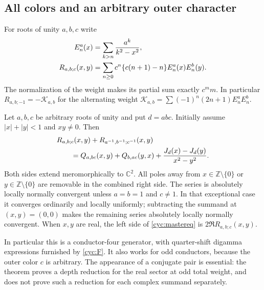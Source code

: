 \subsection{All colors and an arbitrary outer character}

For roots of unity $a,b,c$ write
\begin{align}
 E_n^a(x)&=\sum_{k>n}\frac{a^k}{k^2-x^2},\notag\\
 R_{a,b;c}(x,y)&=\sum_{n\ge0}c^n\{c(n+1)-n\}
                                      E_n^a(x)E_n^b(y).
 \label{cyc:R}
\end{align}
The normalization of the weight makes its partial sum exactly
$c^m m$.  In particular $R_{a,b;-1}=-\mathcal K_{a,b}$ for the
alternating weight $\mathcal K_{a,b}=\sum(-1)^n(2n+1)E_n^aE_n^b$.

\begin{theorem}\label{cyc:master}
Let $a,b,c$ be arbitrary roots of unity and put $d=abc$.  Initially
assume $|x|+|y|<1$ and $xy\ne0$.  Then
\begin{align}\label{cyc:mastereq}
 &R_{a,b;c}(x,y)+R_{a^{-1},b^{-1};c^{-1}}(x,y)\notag\\
 &\qquad=Q_{a,bc}(x,y)+Q_{b,ac}(y,x)
                 +\frac{J_d(x)-J_d(y)}{x^2-y^2}.
\end{align}
Both sides extend meromorphically to $\mathbb C^2$.  All poles away
from $x\in\mathbb Z\setminus\{0\}$ or
$y\in\mathbb Z\setminus\{0\}$ are removable in the combined
right side.  The series is absolutely locally normally convergent
unless $a=b=1$ and $c\ne1$.  In that exceptional case it converges
ordinarily and locally uniformly; subtracting the summand at
$(x,y)=(0,0)$ makes the remaining series absolutely locally normally
convergent.  When $x,y$ are real, the left side of
\eqref{cyc:mastereq} is $2\Re R_{a,b;c}(x,y)$.
\end{theorem}

In particular this is a conductor-four generator, with quarter-shift
digamma expressions furnished by \eqref{cyc:F}.  It also works for
odd conductors, because the outer color $c$ is arbitrary.  The appearance
of a conjugate pair is essential: the theorem proves a depth reduction
for the real sector at odd total weight, and does not prove such a
reduction for each complex summand separately.

